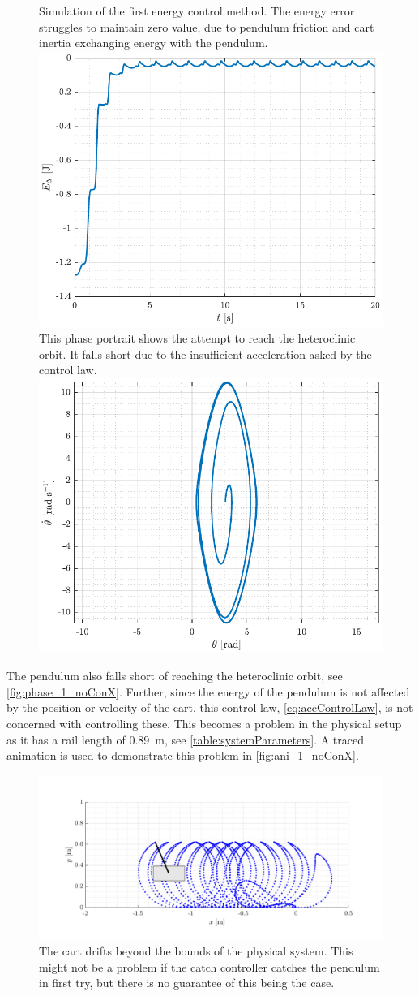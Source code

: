\begin{figure}[H]
  \hspace{-10pt}
  \captionbox
  {
    Simulation of the first energy control method. The energy error struggles to maintain zero value, due to pendulum friction and cart inertia exchanging energy with the pendulum.
    \label{fig:Edelta_1_noConX}
  }
  {
    \hspace{-1cm}
    \includegraphics[width=.46\textwidth]{figures/Edelta_1_noConX}
  }
  \hspace{20pt}
  \captionbox 
  {
    This phase portrait shows the attempt to reach the heteroclinic orbit. It falls short due to the insufficient acceleration asked by the control law.
    \label{fig:phase_1_noConX}
  }
  {
    \hspace{-1cm}
    \includegraphics[width=.46\textwidth]{figures/phase_1_noConX}
  }  
\end{figure}
%
The pendulum also falls short of reaching the heteroclinic orbit, see \autoref{fig:phase_1_noConX}.
Further, since the energy of the pendulum is not affected by the position or velocity of the cart, this control law, \autoref{eq:accControlLaw}, is not concerned with controlling these. This becomes a problem in the physical setup as it has a rail length of \SI{0.89}{m}, see \autoref{table:systemParameters}. A traced animation is used to demonstrate this problem in \autoref{fig:ani_1_noConX}.
\begin{figure}[H]
  \includegraphics[width=.7\textwidth]{figures/ani_1_noConX}
  \caption{The cart drifts beyond the bounds of the physical system. This might not be a problem if the catch controller catches the pendulum in first try, but there is no guarantee of this being the case.}
  \label{fig:ani_1_noConX}
\end{figure}
